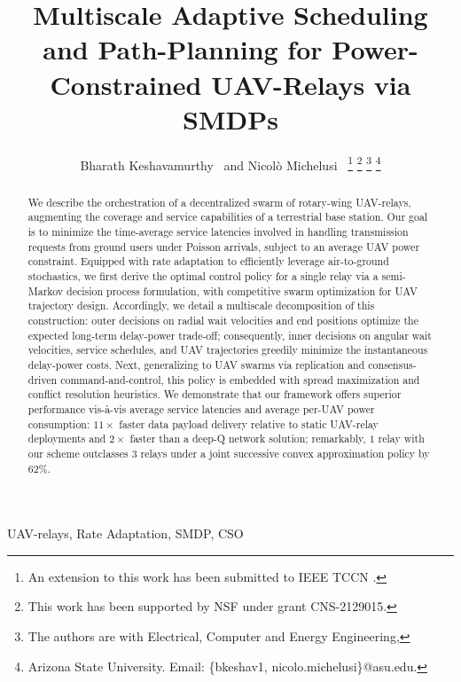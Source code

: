 \documentclass[10pt,twocolumn]{IEEEtran}
\title{Multiscale Adaptive Scheduling and Path-Planning for Power-Constrained UAV-Relays via SMDPs}
\author{Bharath Keshavamurthy~\IEEEmembership{Student Member, IEEE} and Nicol\`{o} Michelusi~\IEEEmembership{Senior Member, IEEE}
\thanks{An extension to this work has been submitted to IEEE TCCN \cite{TCCN_UAV}.}
\thanks{This work has been supported by NSF under grant CNS-2129015.}
\thanks{The authors are with Electrical, Computer and Energy Engineering,}
\thanks{Arizona State University. Email: \{bkeshav1, nicolo.michelusi\}@asu.edu.}
\vspace{-10mm}}
\begin{document}
\maketitle
\thispagestyle{empty}
\pagestyle{empty}
\newcommand{\linespreadexceptabstractandindex}{\setstretch{0.98}}
\newcommand{\linespreadforabstractandindex}{\setstretch{0.991}}
\newcommand{\extraspacebeforesec}{-4mm}
\newcommand{\extraspacebeforesubsubsec}{0.2mm}
\linespreadexceptabstractandindex

\begin{abstract}
We describe the orchestration of a decentralized swarm of rotary-wing UAV-relays, augmenting the coverage and service capabilities of a terrestrial base station. Our goal is to minimize the time-average service latencies involved in handling transmission requests from ground users under Poisson arrivals, subject to an average UAV power constraint. Equipped with rate adaptation to efficiently leverage air-to-ground stochastics, we first derive the optimal control policy for a single relay via a semi-Markov decision process formulation, with competitive swarm optimization for UAV trajectory design. Accordingly, we detail a multiscale decomposition of this construction: outer decisions on radial wait velocities and end positions optimize the expected long-term delay-power trade-off; consequently, inner decisions on angular wait velocities, service schedules, and UAV trajectories greedily minimize the instantaneous delay-power costs. Next, generalizing to UAV swarms via replication and consensus-driven command-and-control, this policy is embedded with spread maximization and conflict resolution heuristics. We demonstrate that our framework offers superior performance vis-à-vis average service latencies and average per-UAV power consumption: $11\times$ faster data payload delivery relative to static UAV-relay deployments and $2\times$ faster than a deep-Q network solution; remarkably, $1$ relay with our scheme outclasses $3$ relays under a joint successive convex approximation policy by $62$\%.
\end{abstract}

\begin{IEEEkeywords}
  UAV-relays, Rate Adaptation, SMDP, CSO
\end{IEEEkeywords}

\glsresetall

\vspace{-4mm}
\end{document}
